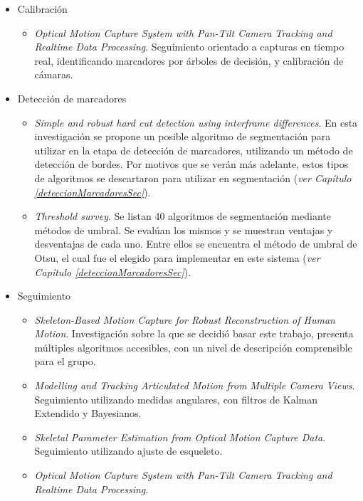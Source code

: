 \begin{itemize}
	\item Calibración
	\begin{itemize}
		\item \emph{Optical Motion Capture System with Pan-Tilt Camera Tracking and Realtime Data Processing}\cite{kurihara2002optical}. Seguimiento orientado a capturas en tiempo real, identificando marcadores por árboles de decisión, y calibración de cámaras.
	\end{itemize}
	\item Detección de marcadores
	\begin{itemize}
		\item \emph{Simple and robust hard cut detection using interframe differences}\cite{pardo2005simple}. En esta investigación se propone un posible algoritmo de segmentación para utilizar en la etapa de detección de marcadores, utilizando un método de detección de bordes. Por motivos que se verán más adelante, estos tipos de algoritmos se descartaron para utilizar en segmentación (\textit{ver Capítulo \ref{deteccionMarcadoresSec}}).
		\item \emph{Threshold survey}\cite{surveyThreshold}. Se listan 40 algoritmos de segmentación mediante métodos de umbral. Se evalúan los mismos y se muestran ventajas y desventajas de cada uno. Entre ellos se encuentra el método de umbral de Otsu\cite{otsu}, el cual fue el elegido para implementar en este sistema (\textit{ver Capítulo \ref{deteccionMarcadoresSec}}).
	\end{itemize}
	\item Seguimiento
	\begin{itemize}
		\item \emph{Skeleton-Based Motion Capture for Robust Reconstruction of Human Motion}\cite{herda}. Investigación sobre la que se decidió basar este trabajo, presenta múltiples algoritmos accesibles, con un nivel de descripción comprensible para el grupo.
		\item \emph{Modelling and Tracking Articulated Motion from Multiple Camera Views}\cite{ringer2000modelling}. Seguimiento utilizando medidas angulares, con filtros de Kalman Extendido y Bayesianos.
		\item \emph{Skeletal Parameter Estimation from Optical Motion Capture Data}\cite{kirk2005skeletal}. Seguimiento utilizando ajuste de esqueleto.
		\item \emph{Optical Motion Capture System with Pan-Tilt Camera Tracking and  Realtime Data Processing}\cite{kurihara2002optical}.

\end{itemize}
\end{itemize}
